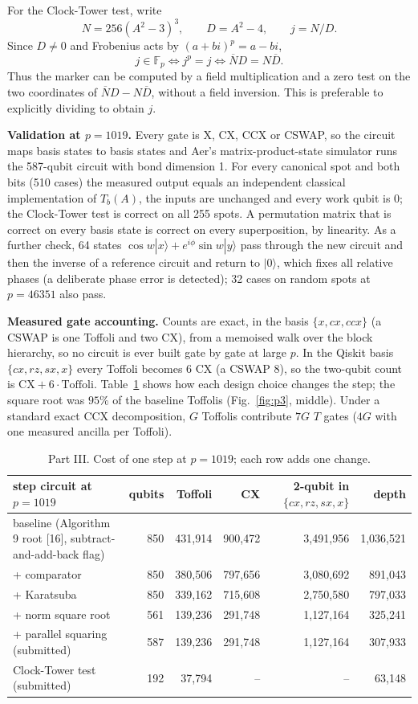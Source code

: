 \documentclass[10pt,a4paper]{article}
\begin{document}
For the Clock-Tower test, write
\[
N=256(A^2-3)^3,\qquad D=A^2-4,\qquad j=N/D.
\]
Since $D\ne0$ and Frobenius acts by $(a+bi)^p=a-bi$,
\[
j\in\mathbb F_p\iff j^p=j
\iff \overline N D=N\overline D.
\]
Thus the marker can be computed by a field multiplication and a zero test on the two coordinates of $\overline N D-N\overline D$, without a field inversion. This is preferable to explicitly dividing to obtain $j$.

\textbf{Validation at $p=1019$.} Every gate is X, CX, CCX or CSWAP, so the circuit maps basis states to basis states and Aer's matrix-product-state simulator runs the 587-qubit circuit with bond dimension 1. For every canonical spot and both bits (510 cases) the measured output equals an independent classical implementation of $T_b(A)$, the inputs are unchanged and every work qubit is $0$; the Clock-Tower test is correct on all 255 spots. A permutation matrix that is correct on every basis state is correct on every superposition, by linearity. As a further check, 64 states $\cos w|x\rangle+e^{i\phi}\sin w|y\rangle$ pass through the new circuit and then the inverse of a reference circuit and return to $|0\rangle$, which fixes all relative phases (a deliberate phase error is detected); 32 cases on random spots at $p=46351$ also pass.

\textbf{Measured gate accounting.} Counts are exact, in the basis $\{x,cx,ccx\}$ (a CSWAP is one Toffoli and two CX), from a memoised walk over the block hierarchy, so no circuit is ever built gate by gate at large $p$. In the Qiskit basis $\{cx,rz,sx,x\}$ every Toffoli becomes 6 CX (a CSWAP 8), so the two-qubit count is $\mathrm{CX}+6\cdot\mathrm{Toffoli}$. Table~\ref{tab:p3} shows how each design choice changes the step; the square root was $95\%$ of the baseline Toffolis (Fig.~\ref{fig:p3}, middle). Under a standard exact CCX decomposition, $G$ Toffolis contribute $7G$ $T$ gates ($4G$ with one measured ancilla per Toffoli).

\begin{table}[ht]
\centering
\scriptsize
\begin{tabular}{lrrrrr}
\toprule
step circuit at $p=1019$ & qubits & Toffoli & CX & 2-qubit in $\{cx,rz,sx,x\}$ & depth \\
\midrule
baseline (Algorithm 9 root [16], subtract-and-add-back flag) & 850 & 431{,}914 & 900{,}472 & 3{,}491{,}956 & 1{,}036{,}521 \\
\quad + comparator & 850 & 380{,}506 & 797{,}656 & 3{,}080{,}692 & 891{,}043 \\
\quad + Karatsuba & 850 & 339{,}162 & 715{,}608 & 2{,}750{,}580 & 797{,}033 \\
\quad + norm square root & 561 & 139{,}236 & 291{,}748 & 1{,}127{,}164 & 325{,}241 \\
\quad + parallel squaring (submitted) & 587 & 139{,}236 & 291{,}748 & 1{,}127{,}164 & 307{,}933 \\
Clock-Tower test (submitted) & 192 & 37{,}794 & -- & -- & 63{,}148 \\
\bottomrule
\end{tabular}
\caption{Part III. Cost of one step at $p=1019$; each row adds one change.}
\label{tab:p3}
\end{table}
\end{document}
